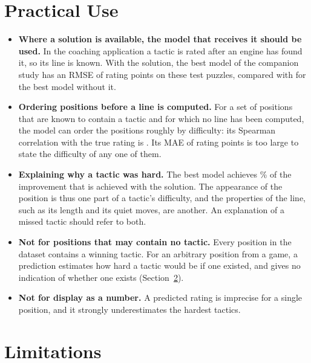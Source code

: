 \documentclass[11pt]{article}
\begin{document}

\fi

\section{Practical Use}
\label{sec:use}

\begin{itemize}
\item \textbf{Where a solution is available, the model that receives it
should be used.} In the coaching application a tactic is rated after an
engine has found it, so its line is known.
\ifshown
With the solution, the best model of the companion study has an RMSE of
 rating points on these test puzzles, compared with
 for the best model without it.
\fi
\item \textbf{Ordering positions before a line is computed.} For a set of
positions that are known to contain a tactic and for which no line has been
computed, the model can order the positions roughly by difficulty: its
Spearman correlation with the true rating is . Its MAE of
 rating points is too large to state the difficulty of any one of
them.
\item \textbf{Explaining why a tactic was hard.}
\ifshown
The best model achieves \% of the improvement
that is achieved with the solution.
\fi
The appearance of the position is thus one part of a tactic's difficulty,
and the properties of the line, such as its length and its quiet moves, are
another. An explanation of a missed tactic should refer to both.
\item \textbf{Not for positions that may contain no tactic.} Every position
in the dataset contains a winning tactic. For an arbitrary position from a
game, a prediction estimates how hard a tactic would be if one existed, and
gives no indication of whether one exists (Section~\ref{sec:limits}).
\item \textbf{Not for display as a number.} A predicted rating is imprecise
for a single position, and it strongly underestimates the hardest tactics.
\end{itemize}

\section{Limitations}
\label{sec:limits}
\end{document}

